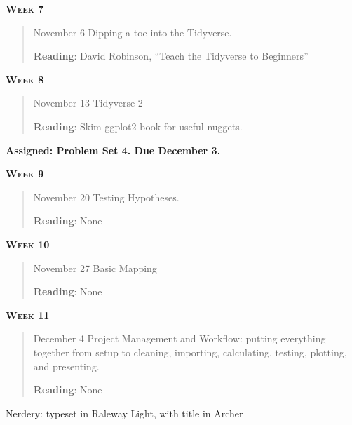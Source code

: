 \documentclass[11pt,letterpaper]{article}
\begin{document}
\newpage

\textbf{\textsc{Week 7}}
		\begin{quote}	
		November 6  \textbullet \space Dipping a toe into the Tidyverse. 
		
		\textbf{Reading}: David Robinson, ``Teach the Tidyverse to Beginners''
		\end{quote}

\textbf{\textsc{Week 8}}
		\begin{quote}	
		November 13 \textbullet \space Tidyverse 2
		
		\textbf{Reading}:  Skim ggplot2 book for useful nuggets.
		\end{quote}

		\textbf{Assigned: Problem Set 4.  Due December 3.}


\textbf{\textsc{Week 9}}
		\begin{quote}	
		November 20  \textbullet \space Testing Hypotheses.  
		
		\textbf{Reading}: None
		\end{quote}


\textbf{\textsc{Week 10}}
		\begin{quote}	
		November 27  \textbullet \space Basic Mapping 
		
		\textbf{Reading}: None
		\end{quote}


\textbf{\textsc{Week 11}}
		\begin{quote}	
		December  4 \textbullet \space Project Management and Workflow: putting everything together from setup to cleaning, importing, calculating, testing, plotting, and presenting. 
		
		\textbf{Reading}:  None 
		\end{quote}



\vfill
{\tiny Nerdery: typeset in Raleway Light, with title in Archer}
\end{document}

